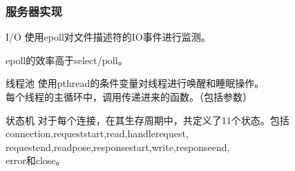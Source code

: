 \documentclass[10pt,dvipdfm]{beamer}
\begin{document}
\begin{frame}
	\frametitle{服务器实现}
	\begin{block}{I/O}
	使用epoll对文件描述符的IO事件进行监测。
	
	epoll的效率高于select/poll。
	\end{block}
	
	\pause
	\begin{block}{线程池}
		使用pthread的条件变量对线程进行唤醒和睡眠操作。\\
		每个线程的主循环中，调用传递进来的函数。（包括参数）\\	
	\end{block}
	
	\pause
	\begin{block}{状态机}
	对于每个连接，在其生存周期中，共定义了11个状态。包括connection,requeststart,read,handlerequest, \\requestend,readpose,responsestart,write,responseend,\\error和close。
	\end{block}
\end{frame}
\end{document}
